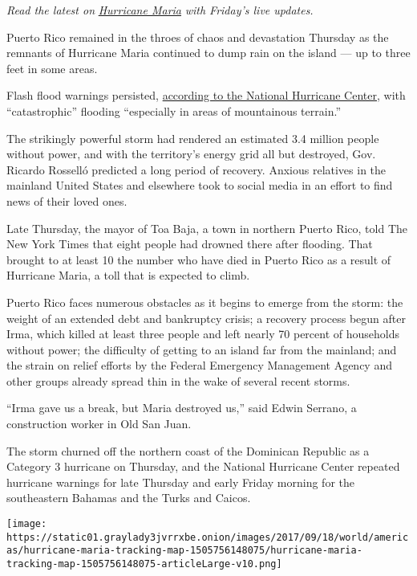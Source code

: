 \emph{Read the latest on}
\href{https://www.nytimes3xbfgragh.onion/2017/09/22/us/hurricane-maria-puerto-rico.html}{\emph{Hurricane
Maria}} \emph{with Friday's live updates.}

Puerto Rico remained in the throes of chaos and devastation Thursday as
the remnants of Hurricane Maria continued to dump rain on the island ---
up to three feet in some areas.

Flash flood warnings persisted,
\href{http://www.nhc.noaa.gov/news/AL152017_key_messages.png?023}{according
to the National Hurricane Center}, with ``catastrophic'' flooding
``especially in areas of mountainous terrain.''

The strikingly powerful storm had rendered an estimated 3.4 million
people without power, and with the territory's energy grid all but
destroyed, Gov. Ricardo Rosselló predicted a long period of recovery.
Anxious relatives in the mainland United States and elsewhere took to
social media in an effort to find news of their loved ones.

Late Thursday, the mayor of Toa Baja, a town in northern Puerto Rico,
told The New York Times that eight people had drowned there after
flooding. That brought to at least 10 the number who have died in Puerto
Rico as a result of Hurricane Maria, a toll that is expected to climb.

Puerto Rico faces numerous obstacles as it begins to emerge from the
storm: the weight of an extended debt and bankruptcy crisis; a recovery
process begun after Irma, which killed at least three people and left
nearly 70 percent of households without power; the difficulty of getting
to an island far from the mainland; and the strain on relief efforts by
the Federal Emergency Management Agency and other groups already spread
thin in the wake of several recent storms.

``Irma gave us a break, but Maria destroyed us,'' said Edwin Serrano, a
construction worker in Old San Juan.

The storm churned off the northern coast of the Dominican Republic as a
Category 3 hurricane on Thursday, and the National Hurricane Center
repeated hurricane warnings for late Thursday and early Friday morning
for the southeastern Bahamas and the Turks and Caicos.

\href{https://www.nytimes3xbfgragh.onion/interactive/2017/09/18/world/americas/hurricane-maria-tracking-map.html}{}

\texttt{[image: https://static01.graylady3jvrrxbe.onion/images/2017/09/18/world/americas/hurricane-maria-tracking-map-1505756148075/hurricane-maria-tracking-map-1505756148075-articleLarge-v10.png]}


